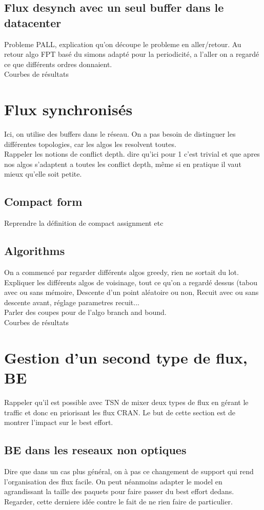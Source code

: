 \documentclass[a4paper,10pt]{article}
\begin{document}
\subsection{Flux desynch avec un seul buffer dans le datacenter}
Probleme PALL, explication qu'on découpe le probleme en aller/retour.
Au retour algo FPT basé du simons adapté pour la periodicité, a l'aller on a regardé ce que différents ordres donnaient.\\
Courbes de résultats
\section{Flux synchronisés}
Ici, on utilise des buffers dans le réseau. On a pas besoin de distinguer les différentes topologies, car les algos les resolvent toutes. \\
Rappeler les notions de conflict depth. dire qu'ici pour 1 c'est trivial et que apres nos algos s'adaptent a toutes les conflict depth, même si en pratique il vaut mieux qu'elle soit petite.
\subsection{Compact form}
Reprendre la définition de compact assignment etc
\subsection{Algorithms}
On a commencé par regarder différents algos greedy, rien ne sortait du lot.
Expliquer les différents algos de voisinage, tout ce qu'on a regardé dessus (tabou avec ou sans mémoire, Descente d'un point aléatoire ou non, Recuit avec ou sans descente avant, réglage parametres recuit...\\
Parler des coupes pour de l'algo branch and bound.\\
Courbes de résultats

\section{Gestion d'un second type de flux, BE}
Rappeler qu'il est possible avec TSN de mixer deux types de flux en gérant le traffic et donc en priorisant les flux CRAN. Le but de cette section est de montrer l'impact sur le best effort.

\subsection{BE dans les reseaux non optiques}
Dire que dans un cas plus général, on à pas ce changement de support qui rend l'organisation des flux facile. On peut néanmoins adapter le model en agrandissant la taille des paquets pour faire passer du best effort dedans. Regarder, cette derniere idée contre le fait de ne rien faire de particulier.
\end{document}
